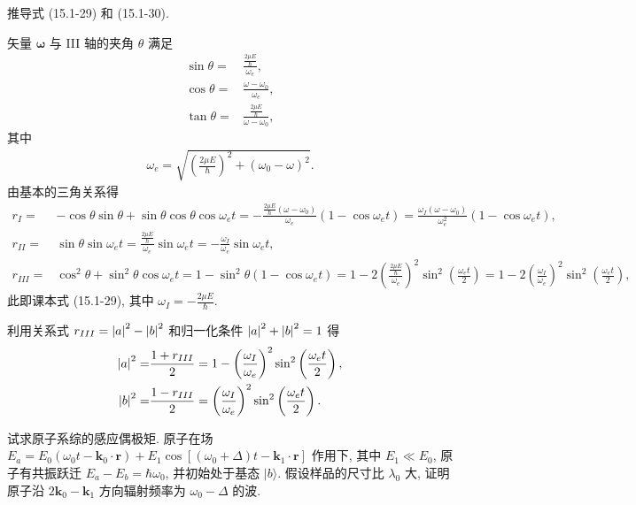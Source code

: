 \documentclass[twoside]{note}
\begin{document}
\begin{exe}
    推导式 (15.1-29) 和 (15.1-30).
\end{exe}
\begin{pf}
    矢量 $\bm{\omega}$ 与 III 轴的夹角 $\theta$ 满足
    \begin{align}
        \sin\theta=&\frac{\frac{2\mu E}{\hbar}}{\omega_e},\\
        \cos\theta=&\frac{\omega-\omega_0}{\omega_e},\\
        \tan\theta=&\frac{\frac{2\mu E}{\hbar}}{\omega-\omega_0},
    \end{align}
    其中
    \begin{align}
        \omega_e=\sqrt{\left(\frac{2\mu E}{\hbar}\right)^2+(\omega_0-\omega)^2}.
    \end{align}
    由基本的三角关系得
    \begin{align}
        r_I=&-\cos\theta\sin\theta+\sin\theta\cos\theta\cos\omega_et=-\frac{\frac{2\mu E}{\hbar}(\omega-\omega_0)}{\omega_e}(1-\cos\omega_et)=\frac{\omega_I(\omega-\omega_0)}{\omega_e^2}(1-\cos\omega_et),\\
        r_{II}=&\sin\theta\sin\omega_et=\frac{\frac{2\mu E}{\hbar}}{\omega_e}\sin\omega_et=-\frac{\omega_I}{\omega_e}\sin\omega_et,\\
        r_{III}=&\cos^2\theta+\sin^2\theta\cos\omega_et=1-\sin^2\theta(1-\cos\omega_et)=1-2\left(\frac{\frac{2\mu E}{\hbar}}{\omega_e}\right)^2\sin^2\left(\frac{\omega_et}{2}\right)=1-2\left(\frac{\omega_I}{\omega_e}\right)^2\sin^2\left(\frac{\omega_et}{2}\right),
    \end{align}
    此即课本式 (15.1-29), 其中 $\omega_I=-\frac{2\mu E}{\hbar}$.

    利用关系式 $r_{III}=\left\lvert a\right\rvert^2-\left\lvert b\right\rvert^2$ 和归一化条件 $\left\lvert a\right\rvert^2+\left\lvert b\right\rvert^2=1$ 得
    \begin{align}
        \left\lvert a\right\rvert^2=&\frac{1+r_{III}}{2}=1-\left(\frac{\omega_I}{\omega_e}\right)^2\sin^2\left(\frac{\omega_et}{2}\right),\\
        \left\lvert b\right\rvert^2=&\frac{1-r_{III}}{2}=\left(\frac{\omega_I}{\omega_e}\right)^2\sin^2\left(\frac{\omega_et}{2}\right).
    \end{align}
\end{pf}

\begin{exe}
    试求原子系综的感应偶极矩. 原子在场 $E_a=E_0(\omega_0t-\bm{k}_0\cdot\bm{r})+E_1\cos[(\omega_0+\Delta)t-\bm{k}_1\cdot\bm{r}]$ 作用下, 其中 $E_1\ll E_0$, 原子有共振跃迁 $E_a-E_b=\hbar\omega_0$, 并初始处于基态 $\lvert b\rangle$. 假设样品的尺寸比 $\lambda_0$ 大, 证明原子沿 $2\bm{k}_0-\bm{k}_1$ 方向辐射频率为 $\omega_0-\Delta$ 的波.
\end{exe}
\begin{sol}

\end{sol}
\end{document}
